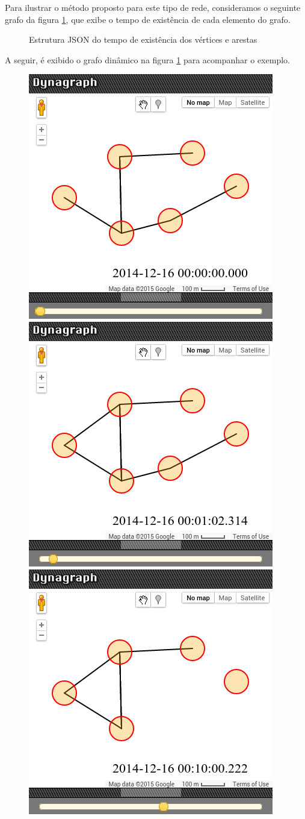 Para ilustrar o método proposto para este tipo de rede, consideramos o seguinte grafo da figura \ref{fig:datatime}, que
exibe o tempo de existência de cada elemento do grafo.


\begin{figure}[htbp]
  \caption{Estrutura JSON do tempo de existência dos vértices e arestas}
  \label{fig:datatime}
\end{figure}
\FloatBarrier

A seguir, é exibido o grafo dinâmico na figura \ref{fig:datatime} para acompanhar o exemplo.

\begin{figure}[htbp]
\centering
 \includegraphics[width=.45\textwidth]{figuras/explicacaoDyn1.png}
 \includegraphics[width=.45\textwidth]{figuras/explicacaoDyn2.png}
 \includegraphics[width=.45\textwidth]{figuras/explicacaoDyn3.png}

\end{figure}
